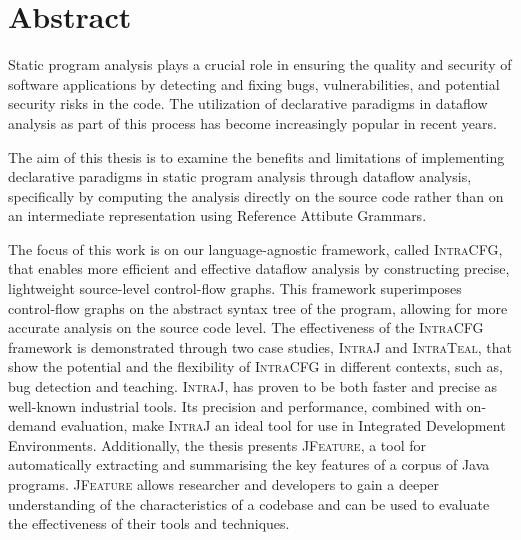 \chapter{Abstract}


Static program analysis plays a crucial role in ensuring the quality and security of 
software applications by detecting and fixing bugs, vulnerabilities, 
and potential security risks in the code. The utilization of declarative paradigms
in dataflow analysis as part of this process has become increasingly popular in recent years.

The aim of this thesis is to examine the benefits and limitations of implementing 
declarative paradigms in static program analysis through dataflow analysis, specifically 
by computing the analysis directly on the source code rather than on an intermediate representation using
Reference Attibute Grammars.

The focus of this work is on our language-agnostic framework, called \textsc{IntraCFG}, 
that enables more efficient and effective dataflow analysis by constructing precise,
lightweight source-level control-flow graphs. This framework superimposes control-flow 
graphs on the abstract syntax tree of the program, allowing for more accurate analysis 
on the source code level. The effectiveness of the \textsc{IntraCFG} framework is 
demonstrated through two case studies, \textsc{IntraJ} and \textsc{IntraTeal}, that 
show the potential and the flexibility of \textsc{IntraCFG} in different contexts,
such as, bug detection and teaching. 
\textsc{IntraJ}, has proven to be both faster and precise as well-known 
industrial tools. Its precision and performance, combined with 
on-demand evaluation, make \textsc{IntraJ} an ideal tool for use in 
Integrated Development Environments. 
Additionally, the thesis presents \textsc{JFeature}, a tool for automatically extracting 
and summarising the key features of a corpus of Java programs. \textsc{JFeature} allows 
researcher and developers to gain a deeper understanding of the characteristics of a codebase and 
can be used to evaluate the effectiveness of their tools and techniques.






